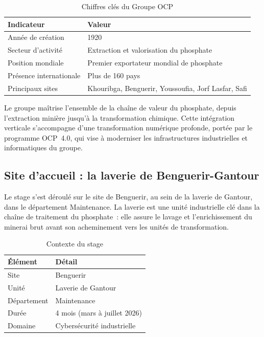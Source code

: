 \documentclass[12pt,a4paper]{report}
\begin{document}
\begin{table}[H]
\centering
\caption{Chiffres clés du Groupe OCP}
\label{tab:ocp_chiffres}
\begin{tabular}{|l|l|}
\hline
\rowcolor{ColSection!15}
\textbf{Indicateur} & \textbf{Valeur} \\
\hline
Année de création       & 1920 \\
Secteur d'activité      & Extraction et valorisation du phosphate \\
Position mondiale       & Premier exportateur mondial de phosphate \\
Présence internationale & Plus de 160 pays \\
Principaux sites        & Khouribga, Benguerir, Youssoufia, Jorf Lasfar, Safi \\
\hline
\end{tabular}
\end{table}

Le groupe maîtrise l'ensemble de la chaîne de valeur du
phosphate, depuis l'extraction minière jusqu'à la
transformation chimique. Cette intégration verticale
s'accompagne d'une transformation numérique profonde,
portée par le programme OCP~4.0, qui vise à moderniser
les infrastructures industrielles et informatiques du groupe.

\subsection{Site d'accueil : la laverie de Benguerir-Gantour}

Le stage s'est déroulé sur le site de Benguerir, au sein de
la laverie de Gantour, dans le département Maintenance. La
laverie est une unité industrielle clé dans la chaîne de
traitement du phosphate~: elle assure le lavage et
l'enrichissement du minerai brut avant son acheminement vers
les unités de transformation.

\begin{table}[H]
\centering
\caption{Contexte du stage}
\label{tab:stage}
\begin{tabular}{|l|l|}
\hline
\rowcolor{ColSection!15}
\textbf{Élément} & \textbf{Détail} \\
\hline
Site            & Benguerir \\
Unité           & Laverie de Gantour \\
Département      & Maintenance \\
Durée           & 4 mois (mars à juillet 2026) \\
Domaine         & Cybersécurité industrielle \\
\hline
\end{tabular}
\end{table}
\end{document}

